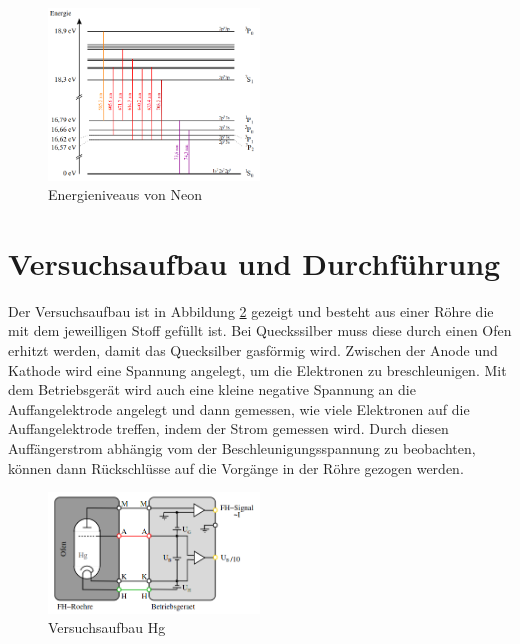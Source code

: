 \documentclass[11pt, a4paper]{article}
\begin{document}
    \begin{figure}[h]
        \centering
        \includegraphics[width=0.5\textwidth]{Screenshot_20230320_160547.png}
        \caption{Energieniveaus von Neon \cite{FHV}}
        \label{fig:Neonenergie}
    \end{figure}

    \section{Versuchsaufbau und Durchführung}

    Der Versuchsaufbau ist in Abbildung \ref{fig:Versuchsaufbau} gezeigt und besteht aus einer Röhre die mit dem jeweilligen Stoff gefüllt ist. Bei Queckssilber muss diese durch einen Ofen erhitzt werden, damit das Quecksilber gasförmig wird. Zwischen der Anode und Kathode wird eine Spannung angelegt, um die Elektronen zu breschleunigen. Mit dem Betriebsgerät wird auch eine kleine negative Spannung an die Auffangelektrode angelegt und dann gemessen, wie viele Elektronen auf die Auffangelektrode treffen, indem der Strom gemessen wird. Durch diesen Auffängerstrom abhängig vom der Beschleunigungsspannung zu beobachten, können dann Rückschlüsse auf die Vorgänge in der Röhre gezogen werden.

    \begin{figure}[h]
        \centering
        \includegraphics[width=0.5\textwidth]{Screenshot_20230320_160645.png}
        \caption{Versuchsaufbau Hg \cite{FHV}}
        \label{fig:Versuchsaufbau}
    \end{figure}
\end{document}
